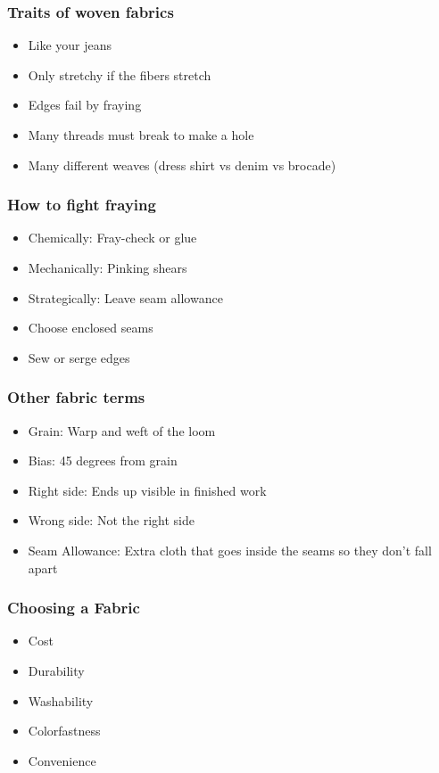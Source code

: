 \documentclass{beamer}
\begin{document}
\begin{frame}[fragile]
\frametitle{Traits of woven fabrics}
\begin{itemize}
\item Like your jeans
\item Only stretchy if the fibers stretch
\item Edges fail by fraying
\item Many threads must break to make a hole
\item Many different weaves (dress shirt vs denim vs brocade)
\end{itemize}
\end{frame}

\begin{frame}[fragile]
\frametitle{How to fight fraying}
\begin{itemize}
\item Chemically: Fray-check or glue
\item Mechanically: Pinking shears
\item Strategically: Leave seam allowance
\item Choose enclosed seams
\item Sew or serge edges
\end{itemize}
\end{frame}

\begin{frame}[fragile]
\frametitle{Other fabric terms}
\begin{itemize}
\item Grain: Warp and weft of the loom
\item Bias: 45 degrees from grain
\item Right side: Ends up visible in finished work
\item Wrong side: Not the right side
\item Seam Allowance: Extra cloth that goes inside the seams so they don't fall apart
\end{itemize}
\end{frame}

\begin{frame}[fragile]
\frametitle{Choosing a Fabric}
\begin{itemize}
\item Cost
\item Durability
\item Washability
\item Colorfastness
\item Convenience
\end{itemize}
\end{frame}
\end{document}
